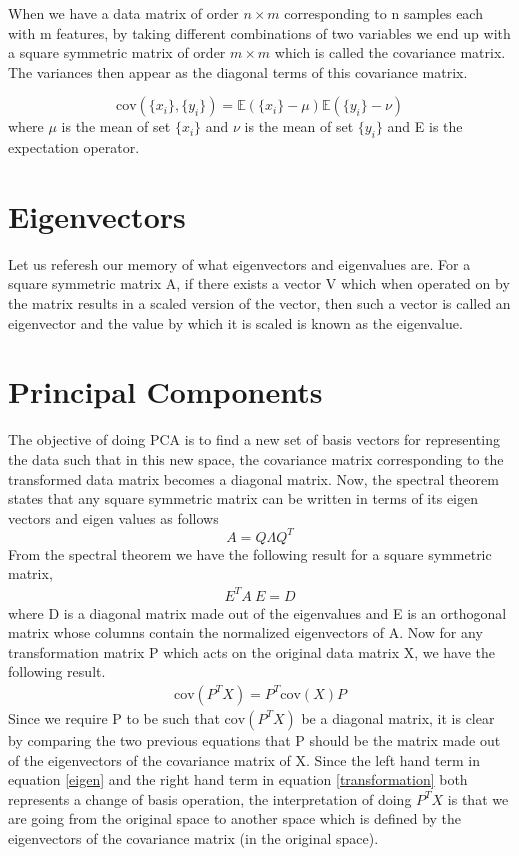 \documentclass{../template/texnote}
\begin{document}
When we have a data matrix of order $n \times m$ corresponding to n samples each with m features, by taking different combinations of two variables we end up with a square symmetric matrix of order $m \times m$ which is called the covariance matrix.
The variances then appear as the diagonal terms of this covariance matrix.

\[
\text{cov}(\{x_i\}, \{y_i\}) = \mathbb{E}(\{x_i\} - \mu) \mathbb{E}(\{y_i\} - \nu)
\]
where $\mu$ is the mean of set $\{x_i\}$ and $\nu$ is the mean of set $\{y_i\}$ and E is the expectation operator.

\section{Eigenvectors}
Let us referesh our memory of what eigenvectors and eigenvalues are. For a square symmetric matrix A, if there exists a vector V which when operated on by the matrix results in a scaled version of the vector, then such a vector is called an eigenvector and the value by which it is scaled is known as the eigenvalue.
\section{Principal Components}
The objective of doing PCA is to find a new set of basis vectors for representing the data such that in this new space, the covariance matrix corresponding to the transformed data matrix becomes a diagonal matrix.
Now, the spectral theorem states that any square symmetric matrix can be written in terms of its eigen vectors and eigen values as follows
\[ 
	A = Q \Lambda Q^{T}
\]
From the spectral theorem we have the following result for a square symmetric matrix,
\begin{align}
	E^{T}A\ E = D
	\label{eigen}
\end{align}
where D is a diagonal matrix made out of the eigenvalues and E is an orthogonal matrix whose columns contain the normalized eigenvectors of A.
Now for any transformation matrix P which acts on the original data matrix X, we have the following result.
\begin{align}
 \text{cov}(P^{T}X) = P^{T} \text{cov}(X) P 
 \label{transformation}
\end{align}
Since we require P to be such that \( \text{cov}(P^{T}X) \) be a diagonal matrix, it is clear by comparing the two previous equations %
that P should be the matrix made out of the eigenvectors of the covariance matrix of X.
Since the left hand term in equation \ref{eigen}  and the right hand term in equation \ref{transformation} both represents a change of basis operation, the interpretation of doing \(P^{T}X\) is that we are going from the original space to another space which is defined by the eigenvectors of the covariance matrix (in the original space).
\end{document}
